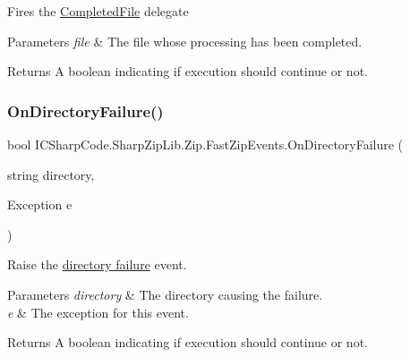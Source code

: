 Fires the \hyperlink{class_i_c_sharp_code_1_1_sharp_zip_lib_1_1_zip_1_1_fast_zip_events_acd15d699c15334063f1500ff5f0633cd}{Completed\+File} delegate 


\begin{DoxyParams}{Parameters}
{\em file} & The file whose processing has been completed.\\
\hline
\end{DoxyParams}
\begin{DoxyReturn}{Returns}
A boolean indicating if execution should continue or not.
\end{DoxyReturn}
\mbox{\label{class_i_c_sharp_code_1_1_sharp_zip_lib_1_1_zip_1_1_fast_zip_events_ae04e152690da472b63336c8640f1d5db}} 
\subsubsection{\texorpdfstring{On\+Directory\+Failure()}{OnDirectoryFailure()}}
{\footnotesize\ttfamily bool I\+C\+Sharp\+Code.\+Sharp\+Zip\+Lib.\+Zip.\+Fast\+Zip\+Events.\+On\+Directory\+Failure (\begin{DoxyParamCaption}\item[{string}]{directory,  }\item[{Exception}]{e }\end{DoxyParamCaption})\hspace{0.3cm}{\ttfamily [inline]}}



Raise the \hyperlink{class_i_c_sharp_code_1_1_sharp_zip_lib_1_1_zip_1_1_fast_zip_events_a33d748361c7dcfd4c40518b99a689979}{directory failure} event. 


\begin{DoxyParams}{Parameters}
{\em directory} & The directory causing the failure.\\
\hline
{\em e} & The exception for this event.\\
\hline
\end{DoxyParams}
\begin{DoxyReturn}{Returns}
A boolean indicating if execution should continue or not.
\end{DoxyReturn}
\mbox{\label{class_i_c_sharp_code_1_1_sharp_zip_lib_1_1_zip_1_1_fast_zip_events_a20ff661e5c72d8a07cbc062ee0851c46}} 
